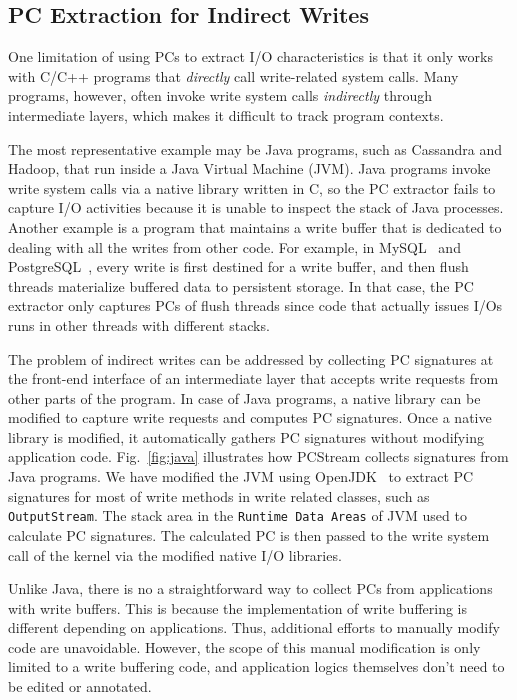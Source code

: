 \subsection{PC Extraction for Indirect Writes}
One limitation of using PCs to extract I/O characteristics is that it only
works with C/C++ programs that \textit{directly} call write-related system
calls.  Many programs, however, often invoke write system calls
\textit{indirectly} through intermediate layers, which makes it difficult to
track program contexts.

The most representative example may be Java programs, such as Cassandra and
Hadoop, that run inside a Java Virtual Machine (JVM). Java programs invoke
write system calls via a native library written in C, so the PC extractor fails
to capture I/O activities because it is unable to inspect the stack of Java
processes.  Another example is a program that maintains a write buffer that is
dedicated to dealing with all the writes from other code. For example, in
MySQL~\cite{MySQL} and PostgreSQL~\cite{PostgreSQL}, every write is first
destined for a write buffer, and then flush threads materialize buffered data
to persistent storage.  In that case, the PC extractor only captures PCs of
flush threads since code that actually issues I/Os runs in other threads with
different stacks.

The problem of indirect writes can be addressed by collecting PC signatures at
the front-end interface of an intermediate layer that accepts write requests
from other parts of the program. In case of Java programs, a native library can
be modified to capture write requests and computes PC signatures. Once a native
library is modified, it automatically gathers PC signatures without modifying
application code. Fig.~\ref{fig:java} illustrates how \textsf{PCStream}
collects signatures from Java programs.  We have modified the JVM using
OpenJDK~\cite{OpenJDK} to extract PC signatures for most of write methods in
write related classes, such as \texttt{OutputStream}.  The stack area in the
\texttt{Runtime Data Areas} of JVM used to calculate PC signatures.  The
calculated PC is then passed to the write system call of the kernel via the
modified native I/O libraries.

Unlike Java, there is no a straightforward way to collect PCs from applications
with write buffers. This is because the implementation of write buffering is
different depending on applications. Thus, additional efforts to manually
modify code are unavoidable. However, the scope of this manual modification is
only limited to a write buffering code, and application logics themselves don't
need to be edited or annotated.

